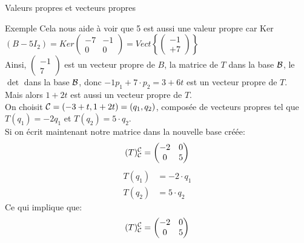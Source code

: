 \begin{parag}{Valeurs propres et vecteurs propres}
\begin{subparag}{Exemple}
        Cela nous aide à voir que 5 est aussi une valeur propre car Ker$(B - 5I_2) = Ker \begin{pmatrix}
            -7 & -1 \\ 0 & 0
        \end{pmatrix} = Vect\left\{\begin{pmatrix}
            -1 \\ +7
        \end{pmatrix}\right\}$\\
        Ainsi, $\begin{pmatrix}
            -1 \\ 7
        \end{pmatrix}$ est un vecteur propre de $B$, la matrice de $T$ dans la base $\mathcal{B}$, le $\det$ dans la base $\mathcal{B}$, donc $-1p_1 + 7\cdot p_2 = 3 +  6t$ est un vecteur propre de $T$.\\
        Mais alors $1 + 2t$ est aussi un vecteur propre de $T$.
        \\
        On choisit $\mathcal{C} = (-3 + t, 1 + 2t) = (q_1, q_2)$, composée de vecteurs propres tel que $T(q_1) = -2q_1$ et $T(q_2) = 5\cdot q_2$.
        \\
        Si on écrit maintenant notre matrice dans la nouvelle base créée:
        \[(T)_{\mathcal{C}}^{\mathcal{C}} = \begin{pmatrix}
            -2  & 0 \\ 0 & 5
        \end{pmatrix}\]
        \begin{align*}
            T(q_1) &= -2\cdot q_1\\
            T(q_2) &= 5\cdot q_2
        \end{align*}
        Ce qui implique que:
        \[(T)_{\mathcal{C}}^{\mathcal{C}} = \begin{pmatrix}
            -2 & 0 \\ 0 & 5
        \end{pmatrix}\]
    \end{subparag}
    \end{parag}     

